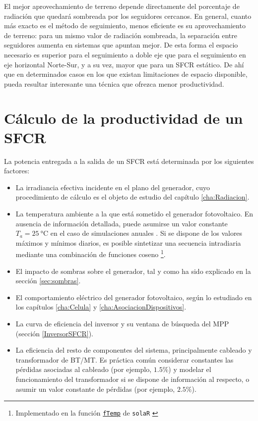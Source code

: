 El mejor aprovechamiento de terreno depende directamente del
porcentaje de radiación que quedará sombreada por los seguidores
cercanos. En general, cuanto más exacto es el método de seguimiento,
menos eficiente es su aprovechamiento de terreno: para un mismo valor
de radiación sombreada, la separación entre seguidores aumenta en
sistemas que apuntan mejor. De esta forma el espacio necesario es
superior para el seguimiento a doble eje que para el seguimiento en eje
horizontal Norte-Sur, y a su vez, mayor que para un SFCR estático. De
ahí que en determinados casos en los que existan limitaciones de
espacio disponible, pueda resultar interesante una técnica que ofrezca
menor productividad.


\section{Cálculo de la productividad de un SFCR}


La potencia entregada a la salida de un SFCR está determinada por los siguientes factores:

\begin{itemize}
\item La irradiancia efectiva incidente en el plano del generador,
  cuyo procedimiento de cálculo es el objeto de estudio del capítulo \ref{cha:Radiacion}.


\item La temperatura ambiente a la que está sometido el generador
  fotovoltaico. En ausencia de información detallada, puede asumirse
  un valor constante $T_a=\SI{25}{\celsius}$ en el caso de
  simulaciones anuales \cite{Perpinan.Lorenzo.ea2007}.  Si se dispone
  de los valores máximos y mínimos diarios, es posible sintetizar una
  secuencia intradiaria mediante una combinación de funciones coseno
  \cite{Huld.Suri.ea2006}\footnote{Implementado en la función
    \href{http://search.r-project.org/R/library/solaR/html/fTemp.html}{\texttt{fTemp}}
    de \texttt{solaR} \cite{Perpinan2012b}}.
\item El impacto de sombras sobre el generador, tal y como ha sido
  explicado en la sección \ref{sec:sombras}.
\item El comportamiento eléctrico del generador fotovoltaico, según lo
  estudiado en los capítulos \ref{cha:Celula} y \ref{cha:AsociacionDispositivos}.
\item La curva de eficiencia del inversor y su ventana de búsqueda del
  MPP (sección \ref{InversorSFCR}).
\item La eficiencia del resto de componentes del sistema,
  principalmente cableado y transformador de BT/MT. Es práctica común
  considerar constantes las pérdidas asociadas al cableado (por
  ejemplo, $1.5\%$) y modelar el funcionamiento del transformador si
  se dispone de información al respecto, o asumir un valor constante
  de pérdidas (por ejemplo, $2.5\%$).
\end{itemize}

